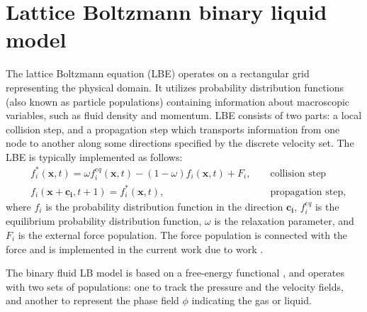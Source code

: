 \documentclass[preprint,12pt]{elsarticle}
\begin{document}
\section{Lattice Boltzmann binary liquid model}
The lattice Boltzmann equation (LBE) operates on a rectangular grid representing the
physical domain. It utilizes
probability distribution functions (also known as particle populations)
containing information about
macroscopic variables, such as fluid density and momentum. LBE consists of
two parts: a local collision step, and a propagation step which transports
information from one node to another along some 
directions specified by the discrete velocity set.
The LBE is typically implemented as follows:
\begin{equation}
\label{standard:implementation}
\begin{aligned}
&f_i^{*}(\bm{x},t)=\omega f_i^{eq}(\bm{x},t)-(1-\omega) f_i(\bm{x},t) +
F_i,&&\text{ collision step}\\
&f_i(\bm{x}+\bm{c_i},t+1)=f_i^{*}(\bm{x},t),&&\text{ propagation step}, 
\end{aligned}
\end{equation}
where $f_i$ is the probability distribution function in the direction $\bm{c_i}$,
{\color{red} $f_i^{eq}$ is the equilibrium probability distribution function}, $\omega$ is the
relaxation parameter, and $F_i$ is the external force population.{\color{red} The force population
is connected with the force and is implemented in the current work due to work \cite{guo}.} 

The binary fluid LB model is
based on a free-energy functional \cite{swift,landau}, and operates with two
sets of populations: one to track the pressure and the velocity fields, and another to represent the
phase field $\phi$ indicating the gas or liquid.
\end{document}
